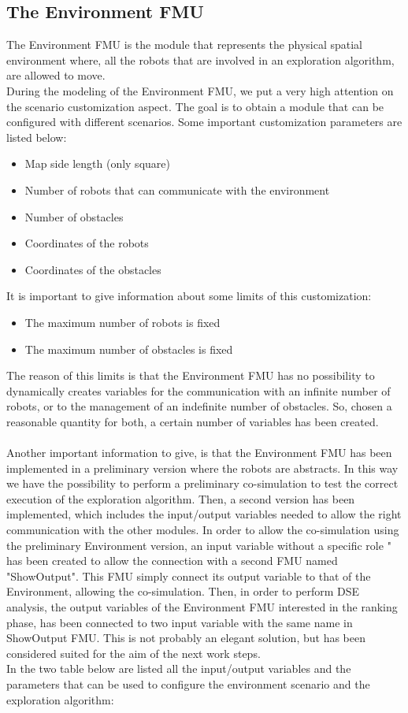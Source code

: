 \documentclass[english]{article}
\begin{document}
\subsection{The Environment FMU}
\label{The Environment FMU}
The Environment FMU is the module that represents the physical spatial environment where, all the robots that are involved in an exploration algorithm, are allowed to move. 
\\During the modeling of the Environment FMU, we put a very high attention on the scenario customization aspect. The goal is to obtain a module that can be configured with different scenarios. Some important customization parameters are listed below:
\begin{itemize}
	\item Map side length (only square)
	\item Number of robots that can communicate with the environment
	\item Number of obstacles
	\item Coordinates of the robots
	\item Coordinates of the obstacles 
\end{itemize}
\noindent It is important to give information about some limits of this customization:
\begin{itemize}
	\item The maximum number of robots is fixed
	\item The maximum number of obstacles is fixed
\end{itemize}
\noindent The reason of this limits is that the Environment FMU has no possibility to dynamically creates variables for the communication with an infinite number of robots, or to the management of an indefinite number of obstacles. So, chosen a reasonable quantity for both, a certain number of variables has been created.\\
\\Another important information to give, is that the Environment FMU has been implemented in a preliminary version where the robots are abstracts. In this way we have the possibility to perform a preliminary co-simulation to test the correct execution of the exploration algorithm. Then, a second version has been implemented, which includes the input/output variables needed to allow the right communication with the other modules. In order to allow the co-simulation using the preliminary Environment version, an input variable without a specific role " has been created to allow the connection with a second FMU named "ShowOutput". This FMU simply connect its output variable to that of the Environment, allowing the co-simulation. Then, in order to perform DSE analysis, the output variables of the Environment FMU interested in the ranking phase, has been connected to two input variable with the same name in ShowOutput FMU. This is not probably an elegant solution, but has been considered suited for the aim of the next work steps.  
\\In the two table below are listed all the input/output variables and the parameters that can be used to configure the environment scenario and the exploration algorithm: 
\end{document}
